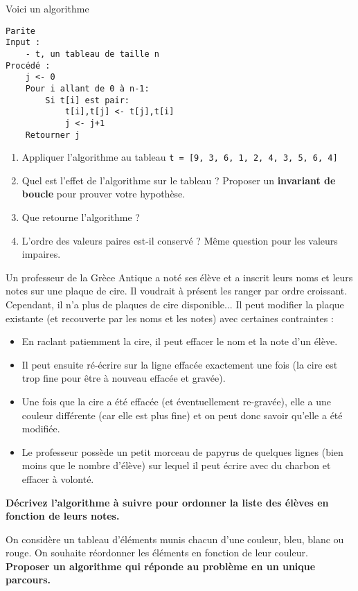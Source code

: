 \documentclass{../cours}
\begin{document}
\begin{exercice}[Parité]

Voici un algorithme

\begin{lstlisting}
Parite
Input :
    - t, un tableau de taille n
Procédé :
    j <- 0
    Pour i allant de 0 à n-1:
        Si t[i] est pair:
            t[i],t[j] <- t[j],t[i]
            j <- j+1
    Retourner j
\end{lstlisting}

\begin{enumerate}
\item Appliquer l'algorithme au tableau {\tt t = [9, 3, 6, 1, 2, 4, 3, 5, 6, 4]}
\item Quel est l'effet de l'algorithme sur le tableau ? Proposer un \textbf{invariant de boucle} pour prouver votre hypothèse.
\item Que retourne l'algorithme ?
\item L'ordre des valeurs paires est-il conservé ? Même question pour les valeurs impaires.
\end{enumerate}

\end{exercice}

\begin{exercice}
Un professeur de la Grèce Antique a noté ses élève et a inscrit leurs noms et leurs notes sur une plaque de cire. Il voudrait à présent les ranger par ordre croissant. Cependant, il n'a plus de plaques de cire disponible... Il peut modifier la plaque existante (et recouverte par les noms et les notes) avec certaines contraintes :
\begin{itemize}
\item En raclant patiemment la cire, il peut effacer le nom et la note d'un élève.
\item Il peut ensuite ré-écrire sur la ligne effacée exactement une fois (la cire est trop fine pour être à nouveau effacée et gravée).
\item Une fois que la cire a été effacée (et éventuellement re-gravée), elle a une couleur différente (car elle est plus fine) et on peut donc savoir qu'elle a été modifiée.
\item Le professeur possède un petit morceau de papyrus de quelques lignes (bien moins que le nombre d'élève) sur lequel il peut écrire avec du charbon et effacer à volonté.
\end{itemize}

\textbf{Décrivez l'algorithme à suivre pour ordonner la liste des élèves en fonction de leurs notes.}
\end{exercice}

\begin{exercice}[Drapeau]
On considère un tableau d'éléments munis chacun d'une couleur, bleu, blanc ou rouge. On souhaite réordonner les éléments en fonction de leur couleur. \textbf{Proposer un algorithme qui réponde au problème en un unique parcours.}

\end{exercice}
\end{document}
